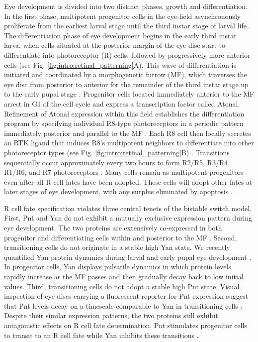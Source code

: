 Eye development is divided into two distinct phases, growth and differentiation. In the first phase, multipotent progenitor cells in the eye-field asynchronously proliferate from the earliest larval stage until the third instar stage of larval life \cite{Wolff1993}. The differentiation phase of eye development begins in the early third instar larva, when cells situated at the posterior margin of the eye disc start to differentiate into photoreceptor (R) cells, followed by progressively more anterior cells (see Fig. \ref{fig:intro:retinal_patterning}A). This wave of differentiation is initiated and coordinated by a morphogenetic furrow (MF), which traverses the eye disc from posterior to anterior for the remainder of the third instar stage up to the early pupal stage \cite{Voas2004}. Progenitor cells located immediately anterior to the MF arrest in G1 of the cell cycle and express a transcription factor called Atonal. Refinement of Atonal expression within this field establishes the differentiation program by specifying individual R8-type photoreceptors in a periodic pattern immediately posterior and parallel to the MF \cite{Jarman1994,Zhang2006}. Each R8 cell then locally secretes an RTK ligand that induces R8's multipotent neighbors to differentiate into other photoreceptor types (see Fig. \ref{fig:intro:retinal_patterning}B) \cite{Freeman1996,Voas2004}. Transitions sequentially occur approximately every two hours to form R2/R5, R3/R4, R1/R6, and R7 photoreceptors \cite{Wolff1993}. Many cells remain as multipotent progenitors even after all R cell fates have been adopted. These cells will adopt other fates at later stages of eye development, with any surplus eliminated by apoptosis \cite{Wolff1991}.

R cell fate specification violates three central tenets of the bistable switch model. First, Pnt and Yan do not exhibit a mutually exclusive expression pattern during eye development. The two proteins are extensively co-expressed in both progenitor and differentiating cells within and posterior to the MF \cite{BoisclairLachance2014}. Second, transitioning cells do not originate in a stable high Yan state. We recently quantified Yan protein dynamics during larval and early pupal eye development \cite{Pelaez2015a}. In progenitor cells, Yan displays pulsatile dynamics in which protein levels rapidly increase as the MF passes and then gradually decay back to low initial values. Third, transitioning cells do not adopt a stable high Pnt state. Visual inspection of eye discs carrying a fluorescent reporter for Pnt expression suggest that Pnt levels decay on a timescale comparable to Yan in transitioning cells \cite{BoisclairLachance2014}. Despite their similar expression patterns, the two proteins still exhibit antagonistic effects on R cell fate determination. Pnt stimulates progenitor cells to transit to an R cell fate while Yan inhibits these transitions \cite{ONeill1994a,Rebay1995}.


